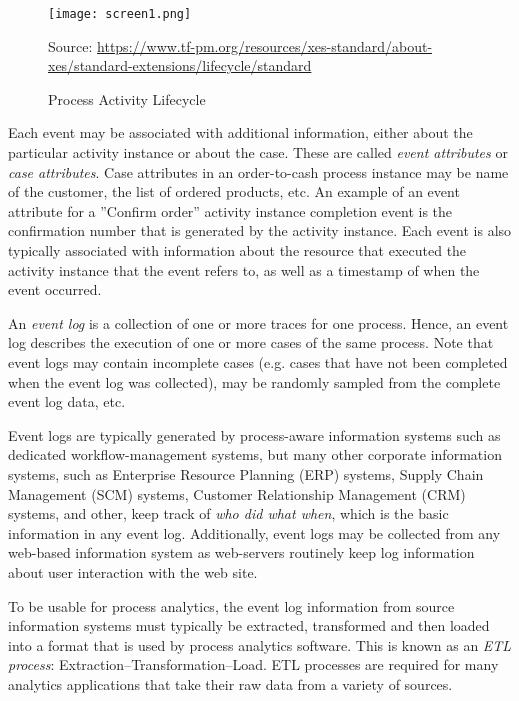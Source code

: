 \begin{figure}
\centering
\texttt{[image: screen1.png]}

\scriptsize Source: \url{https://www.tf-pm.org/resources/xes-standard/about-xes/standard-extensions/lifecycle/standard}
\normalsize
\caption{Process Activity Lifecycle}
\label{fig:activitylifecycle}
\end{figure}

Each event may be associated with additional information, either about the particular activity instance or about the case. These are called \emph{event attributes} or \emph{case attributes}. Case attributes in an order-to-cash process instance may be name of the customer, the list of ordered products, etc. An example of an event attribute for a ''Confirm order'' activity instance completion event is the confirmation number that is generated by the activity instance. Each event is also typically associated with information about the resource that executed the activity instance that the event refers to, as well as a timestamp of when the event occurred.

An \emph{event log} is a collection of one or more traces for one process. Hence, an event log describes the execution of one or more cases of the same process. Note that event logs may contain incomplete cases (e.g. cases that have not been completed when the event log was collected), may be randomly sampled from the complete event log data, etc.

Event logs are typically generated by process-aware information systems such as dedicated workflow-management systems, but many other corporate information systems, such as Enterprise Resource Planning (ERP) systems, Supply Chain Management (SCM) systems, Customer Relationship Management (CRM) systems, and other, keep track of \emph{who did what when}, which is the basic information in any event log. Additionally, event logs may be collected from any web-based information system as web-servers routinely keep log information about user interaction with the web site. 

To be usable for process analytics, the event log information from source information systems must typically be extracted, transformed and then loaded into a format that is used by process analytics software. This is known as an \emph{ETL process}: Extraction--Transformation--Load. ETL processes are required for many analytics applications that take their raw data from a variety of sources.


